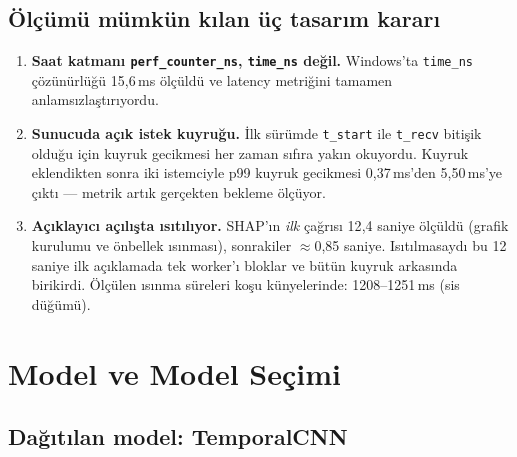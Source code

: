 \documentclass[11pt,a4paper]{report}
\newcommand{\ms}{\,ms}
\newcommand{\kod}[1]{\texttt{\small #1}}
\begin{document}
\section{Ölçümü mümkün kılan üç tasarım kararı}

\begin{enumerate}[leftmargin=1.6em]
\item \textbf{Saat katmanı \kod{perf\_counter\_ns}, \kod{time\_ns} değil.}
Windows'ta \kod{time\_ns} çözünürlüğü 15{,}6\ms{} ölçüldü ve latency metriğini
tamamen anlamsızlaştırıyordu.

\item \textbf{Sunucuda açık istek kuyruğu.} İlk sürümde \kod{t\_start} ile
\kod{t\_recv} bitişik olduğu için kuyruk gecikmesi her zaman sıfıra yakın
okuyordu. Kuyruk eklendikten sonra iki istemciyle p99 kuyruk gecikmesi
0{,}37\ms'den 5{,}50\ms'ye çıktı --- metrik artık gerçekten bekleme ölçüyor.

\item \textbf{Açıklayıcı açılışta ısıtılıyor.} SHAP'ın \emph{ilk} çağrısı
12{,}4 saniye ölçüldü (grafik kurulumu ve önbellek ısınması), sonrakiler
$\approx$0{,}85 saniye. Isıtılmasaydı bu 12 saniye ilk açıklamada tek worker'ı
bloklar ve bütün kuyruk arkasında birikirdi. Ölçülen ısınma süreleri koşu
künyelerinde: 1208--1251\ms{} (sis düğümü).
\end{enumerate}

\chapter{Model ve Model Seçimi}

\section{Dağıtılan model: TemporalCNN}
\end{document}
